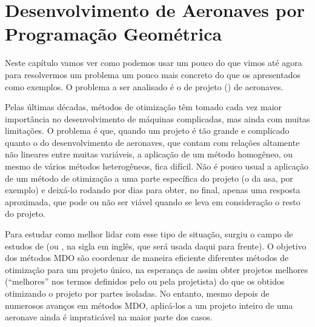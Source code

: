 
%


%

\section{Desenvolvimento de Aeronaves por Programação Geométrica}

Neste capítulo vamos ver como podemos usar um pouco do que vimos até
agora para resolvermos um problema um pouco mais concreto do que os
apresentados como exemplos. O problema a ser analisado é o de projeto
() de aeronaves.

Pelas últimas décadas, métodos de otimização têm tomado cada vez maior
importância no desenvolvimento de máquinas complicadas, mas ainda com
muitas limitações. O problema é que, quando um projeto é tão grande e
complicado quanto o do desenvolvimento de aeronaves, que contam com
relações altamente não lineares entre muitas %
variáveis, a aplicação de um método homogêneo, ou mesmo de vários
métodos heterogêneos, fica difícil. Não é pouco usual a aplicação de
um método de otimização a uma parte específica do projeto (o da asa,
por exemplo) e deixá-lo rodando por dias para obter, no final, apenas
uma resposta aproximada, que pode ou não ser viável quando se leva em
consideração o resto do projeto.

Para estudar como melhor lidar com esse tipo de situação, surgiu o
campo de estudos de 
(ou , 
na sigla em inglês, que será usada daqui para frente). O objetivo dos
métodos MDO são coordenar de maneira eficiente diferentes métodos de
otimização para um projeto único, na esperança de assim obter projetos
melhores (``melhores'' nos termos definidos pelo ou pela projetista)
do que os obtidos otimizando o projeto por partes isoladas.  No
entanto, mesmo depois de numerosos avanços em métodos MDO, aplicá-los
a um projeto inteiro de uma aeronave ainda é impraticável na maior
parte dos casos.

